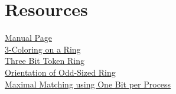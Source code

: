 
\section{Resources}
\href{man.html}{Manual Page}
\\\href{example/ColorRing.html}{3-Coloring on a Ring}
\\\href{example/TokenRingThreeBit.html}{Three Bit Token Ring}
\\\href{example/OrientOddRing.html}{Orientation of Odd-Sized Ring}
\\\href{example/MatchRingOneBit.html}{Maximal Matching using One Bit per Process}





